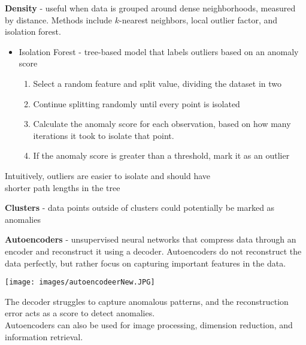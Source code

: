 \documentclass[10pt,landscape]{article}
\begin{document}
\begin{multicols}{3}
\textbf{Density} - useful when data is grouped around dense neighborhoods, measured by distance. Methods include $k$-nearest neighbors, local outlier factor, and isolation forest.
\begin{itemize}[label={--},leftmargin=4mm]
\itemsep -.4mm
\item Isolation Forest - tree-based model that labels outliers based on an anomaly score\\
\vspace{-1.5mm}
\begin{enumerate}[leftmargin=4mm]
\itemsep -.4mm
\item Select a random feature and split value, dividing the dataset in two
\item Continue splitting randomly until every point is isolated
\item Calculate the anomaly score for each observation, based on how many iterations it took to isolate that point.
\item If the anomaly score is greater than a threshold, mark it as an outlier
\end{enumerate}
\end{itemize}
\vspace{-2.5mm}
\hspace{4mm}Intuitively, outliers are easier to isolate and should have\\\hspace{4mm}shorter path lengths in the tree

\vspace{1mm}
\textbf{Clusters} - data points outside of clusters could potentially be marked as anomalies

\vspace{1mm}
\textbf{Autoencoders} - unsupervised neural networks that compress data through an encoder and reconstruct it using a decoder. Autoencoders do not reconstruct the data perfectly, but rather focus on capturing important features in the data.
\begin{center}
\vspace{-2mm}
    \texttt{[image: images/autoencodeerNew.JPG]}
    \vspace{-2mm}
\end{center}
The decoder struggles to capture anomalous patterns, and the reconstruction error acts as a score to detect anomalies.
\\
\smallskip
Autoencoders can also be used for image processing, dimension reduction, and information retrieval.
\smallskip


\end{multicols}
\end{document}
